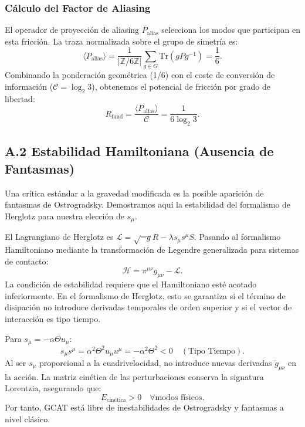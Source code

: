 \documentclass[12pt, a4paper]{article}
\theoremstyle{plain}
\theoremstyle{definition}
\begin{document}
\subsubsection{Cálculo del Factor de Aliasing}
El operador de proyección de aliasing $P_{\text{alias}}$ selecciona los modos que participan en esta fricción. La traza normalizada sobre el grupo de simetría es:
\begin{equation}
\langle P_{\text{alias}} \rangle = \frac{1}{|\mathbb{Z}/6\mathbb{Z}|} \sum_{g \in G} \text{Tr}(g P g^{-1}) = \frac{1}{6}.
\end{equation}
Combinando la ponderación geométrica (1/6) con el coste de conversión de información ($\mathcal{C} = \log_2 3$), obtenemos el potencial de fricción por grado de libertad:
\begin{equation}
R_{\text{fund}} = \frac{\langle P_{\text{alias}} \rangle}{\mathcal{C}} = \frac{1}{6 \log_2 3}.
\end{equation}

\subsection{A.2 Estabilidad Hamiltoniana (Ausencia de Fantasmas)}
\label{app:stability}

Una crítica estándar a la gravedad modificada es la posible aparición de fantasmas de Ostrogradsky. Demostramos aquí la estabilidad del formalismo de Herglotz para nuestra elección de $s_\mu$.

El Lagrangiano de Herglotz es $\mathcal{L} = \sqrt{-g}R - \lambda s_\mu s^\mu S$. Pasando al formalismo Hamiltoniano mediante la transformación de Legendre generalizada para sistemas de contacto:
\begin{equation}
\mathcal{H} = \pi^{\mu\nu} \dot{g}_{\mu\nu} - \mathcal{L}.
\end{equation}
La condición de estabilidad requiere que el Hamiltoniano esté acotado inferiormente. En el formalismo de Herglotz, esto se garantiza si el término de disipación no introduce derivadas temporales de orden superior y si el vector de interacción es tipo tiempo.

Para $s_\mu = -\alpha \Theta u_\mu$:
\begin{equation}
s_\mu s^\mu = \alpha^2 \Theta^2 u_\mu u^\mu = -\alpha^2 \Theta^2 < 0 \quad (\text{Tipo Tiempo}).
\end{equation}
Al ser $s_\mu$ proporcional a la cuadrivelocidad, no introduce nuevas derivadas $\ddot{g}_{\mu\nu}$ en la acción. La matriz cinética de las perturbaciones conserva la signatura Lorentzia, asegurando que:
\begin{equation}
E_{\text{cinética}} > 0 \quad \forall \text{modos físicos}.
\end{equation}
Por tanto, GCAT está libre de inestabilidades de Ostrogradsky y fantasmas a nivel clásico.
\end{document}

